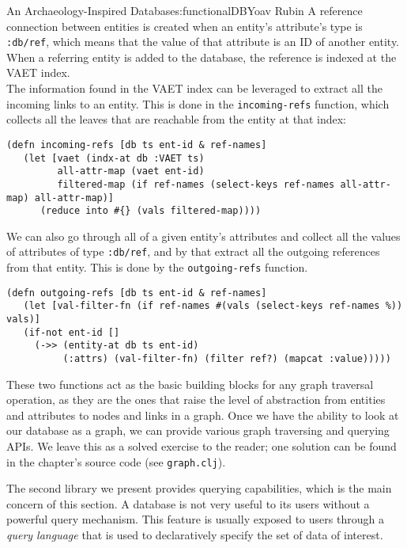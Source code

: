 \begin{aosachapter}{An Archaeology-Inspired Database}{s:functionalDB}{Yoav Rubin}
A reference connection between entities is created when an entity's
attribute's type is \texttt{:db/ref}, which means that the value of that
attribute is an ID of another entity. When a referring entity is added
to the database, the reference is indexed at the VAET index.\\The
information found in the VAET index can be leveraged to extract all the
incoming links to an entity. This is done in the \texttt{incoming-refs}
function, which collects all the leaves that are reachable from the
entity at that index:

\begin{verbatim}
(defn incoming-refs [db ts ent-id & ref-names]
   (let [vaet (indx-at db :VAET ts)
         all-attr-map (vaet ent-id)
         filtered-map (if ref-names (select-keys ref-names all-attr-map) all-attr-map)]
      (reduce into #{} (vals filtered-map))))
\end{verbatim}

We can also go through all of a given entity's attributes and collect
all the values of attributes of type \texttt{:db/ref}, and by that
extract all the outgoing references from that entity. This is done by
the \texttt{outgoing-refs} function.

\begin{verbatim}
(defn outgoing-refs [db ts ent-id & ref-names]
   (let [val-filter-fn (if ref-names #(vals (select-keys ref-names %)) vals)]
   (if-not ent-id []
     (->> (entity-at db ts ent-id)
          (:attrs) (val-filter-fn) (filter ref?) (mapcat :value)))))
\end{verbatim}

These two functions act as the basic building blocks for any graph
traversal operation, as they are the ones that raise the level of
abstraction from entities and attributes to nodes and links in a graph.
Once we have the ability to look at our database as a graph, we can
provide various graph traversing and querying APIs. We leave this as a
solved exercise to the reader; one solution can be found in the
chapter's source code (see \texttt{graph.clj}).

\label{querying-the-database}

The second library we present provides querying capabilities, which is
the main concern of this section. A database is not very useful to its
users without a powerful query mechanism. This feature is usually
exposed to users through a \emph{query language} that is used to
declaratively specify the set of data of interest.


\end{aosachapter}
